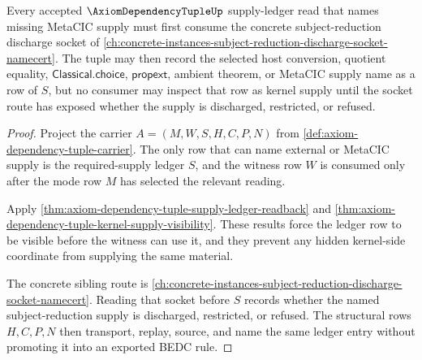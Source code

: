 \begin{theorem}
\label{thm:axiom-dependency-tuple-subject-reduction-socket-dependency-route}
Every accepted $\AxiomDependencyTupleUp$ supply-ledger read that names missing MetaCIC supply must first consume the concrete subject-reduction discharge socket of \autoref{ch:concrete-instances-subject-reduction-discharge-socket-namecert}. The tuple may then record the selected host conversion, quotient equality, $\mathsf{Classical.choice}$, $\mathsf{propext}$, ambient theorem, or MetaCIC supply name as a row of $S$, but no consumer may inspect that row as kernel supply until the socket route has exposed whether the supply is discharged, restricted, or refused.
\end{theorem}
\begin{proof}
Project the carrier $A=(M,W,S,H,C,P,N)$ from \autoref{def:axiom-dependency-tuple-carrier}. The only row that can name external or MetaCIC supply is the required-supply ledger $S$, and the witness row $W$ is consumed only after the mode row $M$ has selected the relevant reading.

Apply \autoref{thm:axiom-dependency-tuple-supply-ledger-readback} and \autoref{thm:axiom-dependency-tuple-kernel-supply-visibility}. These results force the ledger row to be visible before the witness can use it, and they prevent any hidden kernel-side coordinate from supplying the same material.

The concrete sibling route is \autoref{ch:concrete-instances-subject-reduction-discharge-socket-namecert}. Reading that socket before $S$ records whether the named subject-reduction supply is discharged, restricted, or refused. The structural rows $H,C,P,N$ then transport, replay, source, and name the same ledger entry without promoting it into an exported BEDC rule.
\end{proof}
